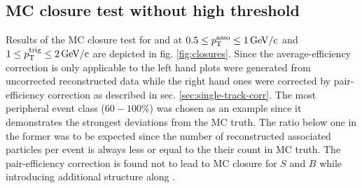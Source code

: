 \subsection[MC closure test without high \pt threshold]{MC closure test without high \ptbold threshold}
\label{sec:closure_no_thresh}
Results of the MC closure test for \Sig and \B at $0.5 \le p_{\text{T}}^{\text{asso}} \le \SI{1}{GeV/c}$ and $1 \le p_{\text{T}}^{\text{trig}} \le \SI{2}{GeV/c}$ are depicted in fig. \ref{fig:closures}. Since the average-efficiency correction is only applicable to \Y the left hand plots were generated from uncorrected reconstructed data while the right hand ones were corrected by pair-efficiency correction as described in sec. \ref{sec:single-track-corr}. The most peripheral event class ($60-100\%$) was chosen as an example since it demonstrates the strongest deviations from the MC truth. The ratio below one in the former was to be expected since the number of reconstructed associated particles per event is always less or equal to the their count in MC truth. The pair-efficiency correction is found not to lead to MC closure for $S$ and $B$ while introducing additional structure along \deta.
